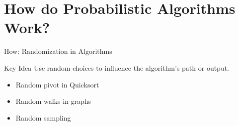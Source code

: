 \documentclass[aspectratio=169]{beamer}
\begin{document}
\section{How do Probabilistic Algorithms Work?}
\begin{frame}{How: Randomization in Algorithms}
  \begin{block}{Key Idea}
    Use random choices to influence the algorithm's path or output.
  \end{block}

  \begin{itemize}
    \item Random pivot in Quicksort

    \item Random walks in graphs

    \item Random sampling
  \end{itemize}
\end{frame}












\begin{frame}[allowframebreaks]
  \printbibliography
\end{frame}
\end{document}
